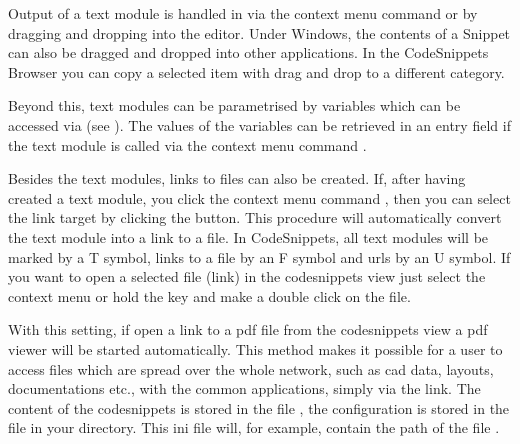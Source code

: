 
Output of a text module is handled in \codeblocks via the context menu command  or by dragging and dropping into the editor. Under Windows, the contents of a Snippet can also be dragged and dropped into other applications. In the CodeSnippets Browser you can copy a selected item with drag and drop to a different category.

Beyond this, text modules can be parametrised by  variables which can be accessed via  (see ). The values of the variables can be retrieved in an entry field if the text module is called via the context menu command .

Besides the text modules, links to files can also be created. If, after having created a text module, you click the context menu command , then you can select the link target by clicking the  button. This procedure will automatically convert the text module into a link to a file. In CodeSnippets, all text modules will be marked by a T symbol, links to a file by an F symbol and urls by an U symbol. If you want to open a selected file (link) in the codesnippets view just select the context menu  or hold the  key and make a double click on the file.


With this setting, if open a link to a pdf file from the codesnippets view a pdf viewer will be started automatically. This method makes it possible for a user to access files which are spread over the whole network, such as cad data, layouts, documentations etc., with the common applications, simply via the link. The content of the codesnippets is stored in the file , the configuration is stored in the file  in your  directory. This ini file will, for example, contain the path of the file .

